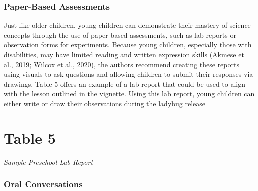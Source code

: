 \documentclass[11.5pt]{sig-alternate}
\begin{document}
\begin{large}
\subsubsection*{Paper-Based Assessments }

Just like older children, young children can dem\-onstrate their mastery of science concepts thro\-ugh the use of paper-based assessments, such as lab reports or observation forms for experiments. Because young children, especially those with disabilities, may have limited reading and written expression skills (Akmese et al., 2019; Wilcox et al., 2020), the authors recommend creating these reports using visuals to ask questions and allowing children to submit their responses via drawings. Table 5 offers an example of a lab report that could be used to align with the lesson outlined in the vignette. Using this lab report, young children can either write or draw their observations during the ladybug release
\newpage
\section*{Table 5}
\textit{Sample Preschool Lab Report}

\noindent \begin{minipage}{\linewidth}
\end{minipage}

\subsubsection*{Oral Conversations }


\end{large}
\end{document}
